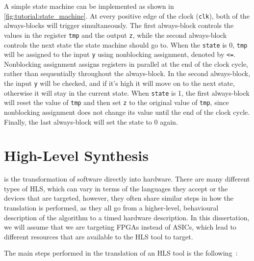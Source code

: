 A simple state machine can be implemented as shown in
\cref{fig:tutorial:state_machine}.  At every positive edge of the clock
(\texttt{clk}), both of the always-blocks will trigger simultaneously.  The
first always-block controls the values in the register \texttt{tmp} and the
output \texttt{z}, while the second always-block controls the next state the
state machine should go to.  When the \texttt{state} is 0, \texttt{tmp} will be
assigned to the input \texttt{y} using nonblocking assignment, denoted by
\texttt{<=}.  Nonblocking assignment assigns registers in parallel at the end of
the clock cycle, rather than sequentially throughout the always-block. In the
second always-block, the input \texttt{y} will be checked, and if it's high it
will move on to the next state, otherwise it will stay in the current state.
When \texttt{state} is 1, the first always-block will reset the value of
\texttt{tmp} and then set \texttt{z} to the original value of \texttt{tmp},
since nonblocking assignment does not change its value until the end of the
clock cycle.  Finally, the last always-block will set the state to 0 again.

\section{High-Level Synthesis}%
\label{sec:bg:hls}

 is the transformation of software directly into hardware.
There are many different types of \gls{HLS}, which can vary in terms of the
languages they accept or the devices that are targeted, however, they often
share similar steps in how the translation is performed, as they all go from a
higher-level, behavioural description of the algorithm to a timed hardware
description.  In this dissertation, we will assume that we are targeting
\glspl{FPGA} instead of \glspl{ASIC}, which lead to different resources that are
available to the \gls{HLS} tool to target.

The main steps performed in the translation of an \gls{HLS} tool is the
following~\cite{coussy09_introd_to_high_level_synth,canis13_l}:

